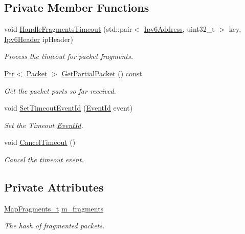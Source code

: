 \subsection*{Private Member Functions}
\begin{DoxyCompactItemize}
\item 
void \hyperlink{classns3_1_1Ipv6ExtensionFragment_a4676eb2d539562fe8b25f6711f120718}{Handle\+Fragments\+Timeout} (std\+::pair$<$ \hyperlink{classns3_1_1Ipv6Address}{Ipv6\+Address}, uint32\+\_\+t $>$ key, \hyperlink{classns3_1_1Ipv6Header}{Ipv6\+Header} ip\+Header)
\begin{DoxyCompactList}\small\item\em Process the timeout for packet fragments. \end{DoxyCompactList}\item 
\hyperlink{classns3_1_1Ptr}{Ptr}$<$ \hyperlink{classns3_1_1Packet}{Packet} $>$ \hyperlink{classns3_1_1Ipv6ExtensionFragment_a6f75c67978120871d9308006f56daed3}{Get\+Partial\+Packet} () const 
\begin{DoxyCompactList}\small\item\em Get the packet parts so far received. \end{DoxyCompactList}\item 
void \hyperlink{classns3_1_1Ipv6ExtensionFragment_aae27f692112a48d0283b59fec7b00f38}{Set\+Timeout\+Event\+Id} (\hyperlink{classns3_1_1EventId}{Event\+Id} event)
\begin{DoxyCompactList}\small\item\em Set the Timeout \hyperlink{classns3_1_1EventId}{Event\+Id}. \end{DoxyCompactList}\item 
void \hyperlink{classns3_1_1Ipv6ExtensionFragment_af7aabaa29fc68fdab347dd6154db22e6}{Cancel\+Timeout} ()
\begin{DoxyCompactList}\small\item\em Cancel the timeout event. \end{DoxyCompactList}\end{DoxyCompactItemize}
\subsection*{Private Attributes}
\begin{DoxyCompactItemize}
\item 
\hyperlink{classns3_1_1Ipv6ExtensionFragment_a6d425bc0c4a0fe492883dfd93d73881d}{Map\+Fragments\+\_\+t} \hyperlink{classns3_1_1Ipv6ExtensionFragment_aa830df260b53ecc85fd602a558232f7f}{m\+\_\+fragments}
\begin{DoxyCompactList}\small\item\em The hash of fragmented packets. \end{DoxyCompactList}\end{DoxyCompactItemize}

